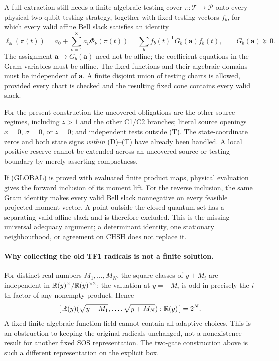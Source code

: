 A full extraction still needs a finite algebraic testing cover
$\pi:\mathcal T\to\mathcal P$ onto every physical two-qubit testing
strategy, together with fixed testing vectors $f_b$, for which
every valid affine Bell slack satisfies an identity
\[
 \ell_{\mathbf a}(\pi(t))
   =a_0+\sum_{\nu=1}^8a_\nu\Phi_\nu(\pi(t))
   =\sum_b f_b(t)^{\mathsf T}G_b(\mathbf a)f_b(t),
 \qquad G_b(\mathbf a)\succeq0 .
 \tag{GLOBAL}
\]
The assignment $\mathbf a\mapsto G_b(\mathbf a)$ need not be affine;
the coefficient equations in the Gram variables must be affine.
The fixed functions and their algebraic domains must be independent
of $\mathbf a$. A finite disjoint union of testing charts is allowed,
provided every chart is checked and the resulting fixed cone
contains every valid slack.

For the present construction the uncovered obligations are the
other source regimes, including $z>1$ and the other C1/C2 branches;
literal source openings $x=0$, $\sigma=0$, or $z=0$; and independent
tests outside (T). The state-coordinate zeros and both state signs
\emph{within} (D)--(T) have already been handled. A local positive
reserve cannot be extended across an uncovered source or testing
boundary by merely asserting compactness.

If (GLOBAL) is proved with evaluated finite product maps, physical
evaluation gives the forward inclusion of its moment lift. For
the reverse inclusion, the same Gram identity makes every valid
Bell slack nonnegative on every feasible projected moment vector.
A point outside the closed quantum set has a separating valid
affine slack and is therefore excluded. This is the missing
universal adequacy argument; a determinant identity, one stationary
neighbourhood, or agreement on CHSH does not replace it.

\paragraph{Why collecting the old TF1 radicals is not a finite solution.}
For distinct real numbers $M_1,\ldots,M_N$, the square classes
of $y+M_i$ are independent in
$\mathbb R(y)^\times/\mathbb R(y)^{\times2}$: the valuation at $y=-M_i$ is odd
in precisely the $i$th factor of any nonempty product. Hence
\[
 [\,\mathbb R(y)(\sqrt{y+M_1},\ldots,\sqrt{y+M_N}):\mathbb R(y)\,]=2^N.
\]
A fixed finite algebraic function field cannot contain all
adaptive choices. This is an obstruction to keeping the original
radicals unchanged, not a nonexistence result for another fixed
SOS representation. The two-gate construction above is such a
different representation on the explicit box.

